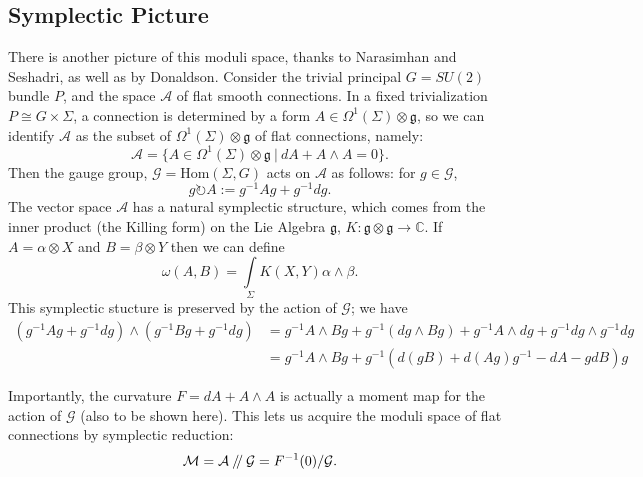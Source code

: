 \documentclass[]{article}
\newcommand{\Hom}{\text{Hom}}
\newcommand{\MM}{\mathcal{M}}
\newcommand{\cA}{\mathcal{A}}
\newcommand{\cG}{\mathcal{G}}
\newcommand{\sslash}{\mathbin{/\mkern-4mu/}}
\begin{document}
	\subsection{Symplectic Picture}
	There is another picture of this moduli space, thanks to Narasimhan and Seshadri, as well as by Donaldson. Consider the trivial principal $G=SU(2)$ bundle $P$, and the space $\cA$ of flat smooth connections. In a fixed trivialization $P \cong G\times \Sigma$, a connection is determined by a form $A \in \Omega^1(\Sigma)\otimes \mathfrak{g}$, so we can identify $\cA$ as the subset of $\Omega^1(\Sigma)\otimes\mathfrak{g}$ of flat connections, namely:
	\begin{equation}
		\cA = \{A \in \Omega^1(\Sigma)\otimes\mathfrak{g} ~|~ dA + A\wedge A = 0\}.
	\end{equation}
	Then the gauge group, $\cG = \Hom(\Sigma, G)$ acts on $\cA$ as follows: for $g\in \cG$,
	\begin{equation}
		g\circlearrowright A := g^{-1}Ag + g^{-1}dg.
	\end{equation}
	The vector space $\cA$ has a natural symplectic structure, which comes from the inner product (the Killing form) on the Lie Algebra $\mathfrak{g}$, $K:\mathfrak{g}\otimes\mathfrak{g}\to\mathbb{C}$. If $A = \alpha \otimes X$ and $B = \beta \otimes Y$ then we can define
	\begin{equation}
		\omega(A,B) = \int\limits_\Sigma K(X,Y)\alpha\wedge \beta.
	\end{equation}
	This symplectic stucture is preserved by the action of $\cG$; we have
	\begin{align*}
		(g^{-1} A g + g^{-1}dg) \wedge (g^{-1} B g + g^{-1}dg) &= g^{-1}A\wedge B g + g^{-1}(dg\wedge Bg) + g^{-1}A\wedge dg + g^{-1}dg \wedge g^{-1}dg \\
		&= g^{-1} A\wedge B g + g^{-1}(d(gB) + d(Ag)g^{-1} - dA - gdB)g
	\end{align*}
	
	Importantly, the curvature $F = dA + A\wedge A$ is actually a moment map for the action of $\cG$ (also to be shown here). This lets us acquire the moduli space of flat connections by symplectic reduction:
	\begin{equation}
		\MM = \cA\sslash\cG = F^{-1}(0)/ \cG.
	\end{equation} 
	
	
\end{document}
